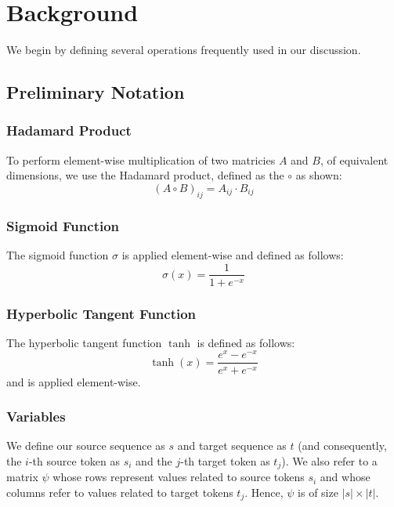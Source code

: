 \documentclass[twoside,twocolumn]{article}
\begin{document}
\section{Background}
We begin by defining several operations frequently used in our discussion.

\subsection{Preliminary Notation}

\subsubsection{Hadamard Product}

To perform element-wise multiplication of two matricies $A$ and $B$, of
equivalent dimensions, we use the Hadamard product, defined as the $\circ$ as
shown:
\begin{equation}
  (A \circ B)_{ij} = A_{ij} \cdot B_{ij}
\end{equation}

\subsubsection{Sigmoid Function}

The sigmoid function $\sigma$ is applied element-wise and defined as follows:
\begin{equation}
  \sigma(x) = \frac{1}{1+e^{-x}}
\end{equation}

\subsubsection{Hyperbolic Tangent Function}

The hyperbolic tangent function $\tanh$ is defined as follows:
\begin{equation}
  \tanh(x) = \frac{e^x - e^{-x}} {e^x + e^{-x}}
\end{equation}
and is applied element-wise.

\subsubsection{Variables}
We define our source sequence as $s$ and target sequence as $t$ (and
consequently, the $i$-th source token as $s_i$ and the $j$-th target token as
$t_j$).
We also refer to a matrix $\psi$ whose rows represent values related to source
tokens $s_i$ and whose columns refer to values related to target tokens $t_j$.
Hence, $\psi$ is of size $|s| \times |t|$.
\end{document}

